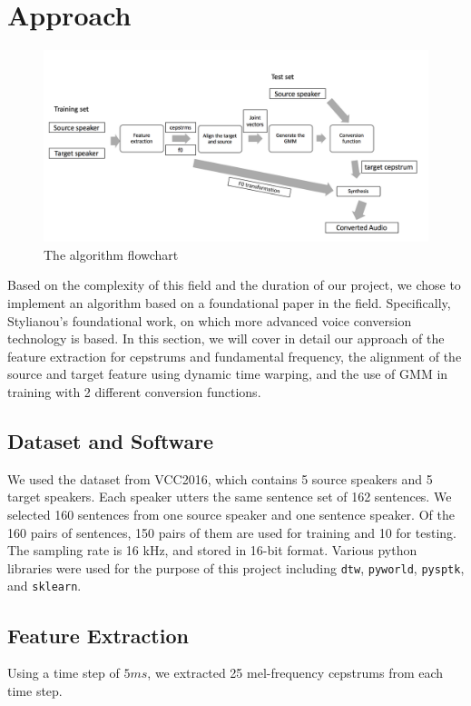 \section{Approach}
\label{sec:pagestyle}
\begin{figure}[t]
  \centering
  \centerline{\includegraphics[width=\linewidth]{image11}}
\caption{The algorithm flowchart}
\label{fig:algorithm}
%
\end{figure}

Based on the complexity of this field and the duration of our project, we chose to implement an algorithm based on a foundational paper in the field. Specifically, Stylianou's foundational work\cite{stylianou1998continuous}, on which more advanced voice conversion technology is based. In this section, we will cover in detail our approach of the feature extraction for cepstrums and fundamental frequency, the alignment of the source and target feature using dynamic time warping, and the use of GMM in training with 2 different conversion functions. 

\subsection{Dataset and Software}We used the dataset from VCC2016\cite{toda2016voice}, which contains 5 source speakers and 5 target speakers. Each speaker utters the same sentence set of 162 sentences. We selected 160 sentences from one source speaker and one sentence speaker. Of the 160 pairs of sentences,  150 pairs of them are used for training and 10 for testing. The sampling rate is 16 kHz, and stored in 16-bit format. Various python libraries were used for the purpose of this project including \texttt{dtw}, \texttt{pyworld}, \texttt{pysptk}, and \texttt{sklearn}.

\subsection{Feature Extraction}
Using a time step of $5ms$, we extracted 25 mel-frequency cepstrums from each time step.
